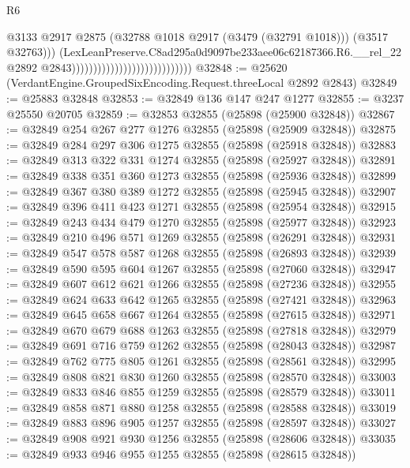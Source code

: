 \begin{lexlean}{R6}
\begin{coremodule}
                                                              @3133
                                                              @2917
                                                              @2875
                                                              (@32788
                                                                @1018
                                                                @2917
                                                                (@3479 (@32791 @1018)))
                                                              (@3517 @32763)))
                                                          (LexLeanPreserve.C8ad295a0d9097be233aee06c62187366.R6.__rel_22
                                                            @2892
                                                            @2843))))))))))))))))))))))))))))
@32848 := @25620 (VerdantEngine.GroupedSixEncoding.Request.threeLocal @2892 @2843)
@32849 := @25883 @32848
@32853 := @32849 @136 @147 @247 @1277
@32855 := @3237 @25550 @20705
@32859 := @32853 @32855 (@25898 (@25900 @32848))
@32867 := @32849 @254 @267 @277 @1276 @32855 (@25898 (@25909 @32848))
@32875 := @32849 @284 @297 @306 @1275 @32855 (@25898 (@25918 @32848))
@32883 := @32849 @313 @322 @331 @1274 @32855 (@25898 (@25927 @32848))
@32891 := @32849 @338 @351 @360 @1273 @32855 (@25898 (@25936 @32848))
@32899 := @32849 @367 @380 @389 @1272 @32855 (@25898 (@25945 @32848))
@32907 := @32849 @396 @411 @423 @1271 @32855 (@25898 (@25954 @32848))
@32915 := @32849 @243 @434 @479 @1270 @32855 (@25898 (@25977 @32848))
@32923 := @32849 @210 @496 @571 @1269 @32855 (@25898 (@26291 @32848))
@32931 := @32849 @547 @578 @587 @1268 @32855 (@25898 (@26893 @32848))
@32939 := @32849 @590 @595 @604 @1267 @32855 (@25898 (@27060 @32848))
@32947 := @32849 @607 @612 @621 @1266 @32855 (@25898 (@27236 @32848))
@32955 := @32849 @624 @633 @642 @1265 @32855 (@25898 (@27421 @32848))
@32963 := @32849 @645 @658 @667 @1264 @32855 (@25898 (@27615 @32848))
@32971 := @32849 @670 @679 @688 @1263 @32855 (@25898 (@27818 @32848))
@32979 := @32849 @691 @716 @759 @1262 @32855 (@25898 (@28043 @32848))
@32987 := @32849 @762 @775 @805 @1261 @32855 (@25898 (@28561 @32848))
@32995 := @32849 @808 @821 @830 @1260 @32855 (@25898 (@28570 @32848))
@33003 := @32849 @833 @846 @855 @1259 @32855 (@25898 (@28579 @32848))
@33011 := @32849 @858 @871 @880 @1258 @32855 (@25898 (@28588 @32848))
@33019 := @32849 @883 @896 @905 @1257 @32855 (@25898 (@28597 @32848))
@33027 := @32849 @908 @921 @930 @1256 @32855 (@25898 (@28606 @32848))
@33035 := @32849 @933 @946 @955 @1255 @32855 (@25898 (@28615 @32848))

\end{coremodule}
\end{lexlean}
